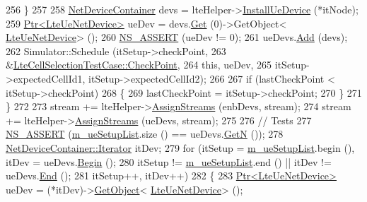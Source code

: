 \begin{DoxyCode}
256         \}
257 
258       \hyperlink{classns3_1_1NetDeviceContainer}{NetDeviceContainer} devs = lteHelper->\hyperlink{classns3_1_1LteHelper_ac9cd932d7de92811cfa953c2e3b2fc9f}{InstallUeDevice} (*itNode);
259       \hyperlink{classns3_1_1Ptr}{Ptr<LteUeNetDevice>} ueDev = devs.\hyperlink{classns3_1_1NetDeviceContainer_a677d62594b5c9d2dea155cc5045f4d0b}{Get} (0)->GetObject<
      \hyperlink{classns3_1_1LteUeNetDevice}{LteUeNetDevice}> ();
260       \hyperlink{assert_8h_a6dccdb0de9b252f60088ce281c49d052}{NS\_ASSERT} (ueDev != 0);
261       ueDevs.\hyperlink{classns3_1_1NetDeviceContainer_a7ca8bc1d7ec00fd4fcc63869987fbda5}{Add} (devs);
262       Simulator::Schedule (itSetup->checkPoint,
263                            &\hyperlink{classLteCellSelectionTestCase_a12372e70c3609e0c3606a67494bc819e}{LteCellSelectionTestCase::CheckPoint},
264                            \textcolor{keyword}{this}, ueDev,
265                            itSetup->expectedCellId1, itSetup->expectedCellId2);
266 
267       \textcolor{keywordflow}{if} (lastCheckPoint < itSetup->checkPoint)
268         \{
269           lastCheckPoint = itSetup->checkPoint;
270         \}
271     \}
272 
273   stream += lteHelper->\hyperlink{classns3_1_1LteHelper_ae90d941582aa49a1b28c9301ece35b07}{AssignStreams} (enbDevs, stream);
274   stream += lteHelper->\hyperlink{classns3_1_1LteHelper_ae90d941582aa49a1b28c9301ece35b07}{AssignStreams} (ueDevs, stream);
275 
276   \textcolor{comment}{// Tests}
277   \hyperlink{assert_8h_a6dccdb0de9b252f60088ce281c49d052}{NS\_ASSERT} (\hyperlink{classLteCellSelectionTestCase_a09e2b5bfbe6cd4fbd482dde48078a8c7}{m\_ueSetupList}.size () == ueDevs.\hyperlink{classns3_1_1NetDeviceContainer_a74cafc212479bc38976bebd118e856b9}{GetN} ());
278   \hyperlink{classns3_1_1NetDeviceContainer_a45709bb572f975569ed985fa89b132f8}{NetDeviceContainer::Iterator} itDev;
279   \textcolor{keywordflow}{for} (itSetup = \hyperlink{classLteCellSelectionTestCase_a09e2b5bfbe6cd4fbd482dde48078a8c7}{m\_ueSetupList}.begin (), itDev = ueDevs.\hyperlink{classns3_1_1NetDeviceContainer_ad5aac47677fe7277e232bdec5b48a8fc}{Begin} ();
280        itSetup != \hyperlink{classLteCellSelectionTestCase_a09e2b5bfbe6cd4fbd482dde48078a8c7}{m\_ueSetupList}.end () || itDev != ueDevs.\hyperlink{classns3_1_1NetDeviceContainer_a8af596b06daf9613da60b4379861d770}{End} ();
281        itSetup++, itDev++)
282     \{
283       \hyperlink{classns3_1_1Ptr}{Ptr<LteUeNetDevice>} ueDev = (*itDev)->\hyperlink{classns3_1_1Object_a13e18c00017096c8381eb651d5bd0783}{GetObject}<
      \hyperlink{classns3_1_1LteUeNetDevice}{LteUeNetDevice}> ();

\end{DoxyCode}
